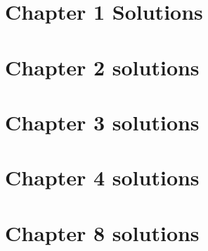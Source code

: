 \documentclass{article}
\begin{document}
\section{Chapter 1 Solutions}

\newpage

\section{Chapter 2 solutions}
\label{sec:chapter-2-solutions}

%



%

%

%

%

%

%

%

%


%

%

%

%

%

%

%


\newpage
\section{Chapter 3 solutions}


\newpage
\section{Chapter 4 solutions}



\newpage
\section{Chapter 8 solutions}

\end{document}

